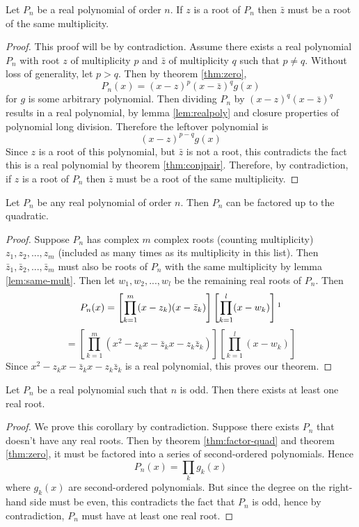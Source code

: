 \documentclass[11pt]{article}
\numberwithin{lemma}{section}
\numberwithin{equation}{section}
\numberwithin{define}{section}
\numberwithin{prop}{section}
\numberwithin{figure}{section}
\numberwithin{theorem}{section}
\numberwithin{cor}{section}
\newcounter{ex}[section]
\numberwithin{ex}{section}
\def\sbrak#1{\left[#1\right]}
\begin{document}
\begin{lemma}
\label{lem:same-mult}
	Let $P_n$ be a real polynomial of order $n$. If $z$ is a root of $P_n$ then $\bar z$ must be a root of the same multiplicity.
\end{lemma}
\begin{proof}
	This proof will be by contradiction. Assume there exists a real polynomial $P_n$ with root $z$ of multiplicity $p$ and $\bar z$ of multiplicity $q$ such that $p\neq q$. 
	Without loss of generality, let $p>q$.
	Then by theorem \eqref{thm:zero},
	$$P_n(x)=(x-z)^p(x-\bar z)^q g(x)$$
	for $g$ is some arbitrary polynomial.
	Then dividing $P_n$ by $(x-z)^q(x-\bar z)^q$ results in a real polynomial, by lemma \eqref{lem:realpoly} and closure properties of polynomial long division.
	Therefore the leftover polynomial is
	$$(x-z)^{p-q} g(x)$$
	Since $z$ is a root of this polynomial, but $\bar z$ is not a root, this contradicts the fact this is a real polynomial by theorem \eqref{thm:conjpair}. Therefore, by contradiction, if $z$ is a root of $P_n$ then $\bar z$ must be a root of the same multiplicity.
\end{proof}
\begin{theorem}
\label{thm:factor-quad}
Let $P_n$ be any real polynomial of order $n$. Then $P_n$ can be factored up to the quadratic.	
\end{theorem}
\begin{proof}
	Suppose $P_n$ has complex $m$ complex roots (counting multiplicity) $z_1,z_2,...,z_m$ (included as many times as its multiplicity in this list). 
	Then $\bar z_1,\bar z_2,...,\bar z_m$ must also be roots of $P_n$ with the same multiplicity by lemma \eqref{lem:same-mult}. Then let $w_1,w_2,...,w_l$ be the remaining real roots of $P_n$. Then
	$$P_n(x)=\sbrak{\prod^m_{k=1}(x-z_k)(x-\bar z_k)}
	\sbrak{\prod^l_{k=1}(x-w_k)}\footnotemark$$
	$$=\sbrak{\prod^m_{k=1}(x^2-z_kx-\bar z_k x-z_k\bar z_k)}
	\sbrak{\prod^l_{k=1}(x-w_k)}$$
	Since $x^2-z_kx-\bar z_k x-z_k\bar z_k$ is a real polynomial, this proves our theorem.
\end{proof}

\begin{cor}
Let $P_n$ be a real polynomial such that $n$ is odd. Then there exists at least one real root.	
\end{cor}
\begin{proof}
	We prove this corollary by contradiction. Suppose there exists $P_n$ that doesn't have any real roots. Then by theorem \eqref{thm:factor-quad} and theorem \eqref{thm:zero}, it must be factored into a series of second-ordered polynomials. Hence
	$$P_n(x)=\prod_k g_k(x)$$
	where $g_k(x)$ are second-ordered polynomials. But since the degree on the right-hand side must be even, this contradicts the fact that $P_n$ is odd, hence by contradiction, $P_n$ must have at least one real root. 
\end{proof}
\end{document}

